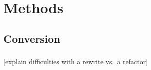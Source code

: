 \documentclass{beamer}
\newcommand{\tbackground}[1]{#1}
\newcommand{\tbackground}[1]{\textcolor{tbackground}{#1}}
\begin{document}

\section{Methods}

\subsection{Conversion}
\begin{frame}\frametitle{\subsecname}
	[\tbackground{explain difficulties with a rewrite vs.\ a refactor}]
\end{frame}
\end{document}

